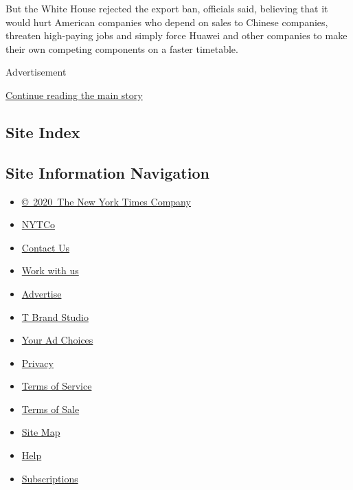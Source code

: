 But the White House rejected the export ban, officials said, believing
that it would hurt American companies who depend on sales to Chinese
companies, threaten high-paying jobs and simply force Huawei and other
companies to make their own competing components on a faster timetable.

Advertisement

\protect\hyperlink{after-bottom}{Continue reading the main story}

\hypertarget{site-index}{%
\subsection{Site Index}\label{site-index}}

\hypertarget{site-information-navigation}{%
\subsection{Site Information
Navigation}\label{site-information-navigation}}

\begin{itemize}
\tightlist
\item
  \href{https://help.nytimes.com/hc/en-us/articles/115014792127-Copyright-notice}{©~2020~The
  New York Times Company}
\end{itemize}

\begin{itemize}
\tightlist
\item
  \href{https://www.nytco.com/}{NYTCo}
\item
  \href{https://help.nytimes.com/hc/en-us/articles/115015385887-Contact-Us}{Contact
  Us}
\item
  \href{https://www.nytco.com/careers/}{Work with us}
\item
  \href{https://nytmediakit.com/}{Advertise}
\item
  \href{http://www.tbrandstudio.com/}{T Brand Studio}
\item
  \href{https://www.nytimes.com/privacy/cookie-policy\#how-do-i-manage-trackers}{Your
  Ad Choices}
\item
  \href{https://www.nytimes.com/privacy}{Privacy}
\item
  \href{https://help.nytimes.com/hc/en-us/articles/115014893428-Terms-of-service}{Terms
  of Service}
\item
  \href{https://help.nytimes.com/hc/en-us/articles/115014893968-Terms-of-sale}{Terms
  of Sale}
\item
  \href{https://spiderbites.nytimes.com}{Site Map}
\item
  \href{https://help.nytimes.com/hc/en-us}{Help}
\item
  \href{https://www.nytimes.com/subscription?campaignId=37WXW}{Subscriptions}
\end{itemize}

